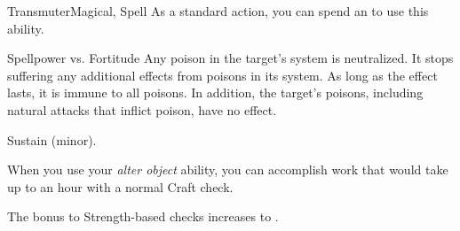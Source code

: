 \begin{feat}{Transmuter}{Magical, Spell}
         As a standard action, you can spend an  to use this ability.
        \begin{ability}
            \begin{spelltargetinginfo}
            \end{spelltargetinginfo}
            \begin{spelleffects}
                \begin{spellattack}{Spellpower vs. Fortitude}
                    \spellsuccess Any poison in the target's system is neutralized.
                    It stops suffering any additional effects from poisons in its system.
                    As long as the effect lasts, it is immune to all poisons.
                    In addition, the target's  poisons, including natural attacks that inflict poison, have no effect.
                \end{spellattack}
                \spelldur Sustain (minor).
            \end{spelleffects}
        \end{ability}

         When you use your \textit{alter object} ability, you can accomplish work that would take up to an hour with a normal Craft check.

         The bonus to Strength-based checks increases to .
    \end{feat}

